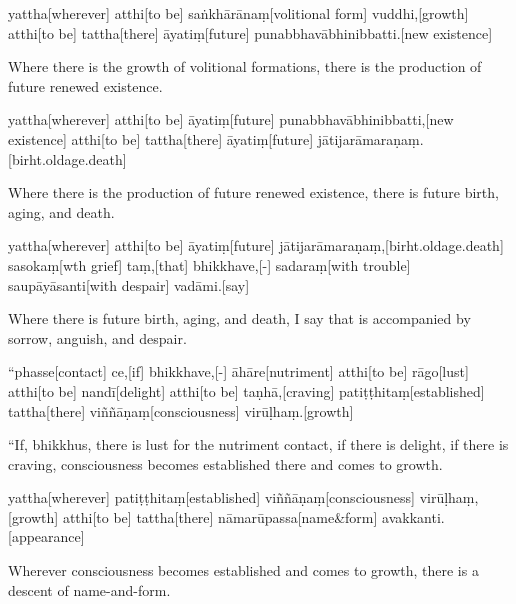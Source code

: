 \begin{samepage}
\begingl[glneveryline={\PaliGlossA,\PaliGlossB}]
yattha[wherever] atthi[to be] saṅkhārānaṃ[volitional form] vuddhi,[growth] atthi[to be] tattha[there] āyatiṃ[future] punabbhavābhinibbatti.[new existence]
\endgl
\nopagebreak
\linespread{0.5}
\begin{spacin}{0.2}
{\PaliGlossFT Where there is the growth of volitional formations, there is the production of future renewed existence.}
\end{spacin}
\vskip 12pt
\end{samepage}
\begin{samepage}
\begingl[glneveryline={\PaliGlossA,\PaliGlossB}]
yattha[wherever] atthi[to be] āyatiṃ[future] punabbhavābhinibbatti,[new existence] atthi[to be] tattha[there] āyatiṃ[future] jātijarāmaraṇaṃ.[birht.oldage.death]
\endgl
\nopagebreak
\linespread{0.5}
\begin{spacin}{0.2}
{\PaliGlossFT Where there is the production of future renewed existence, there is future birth, aging, and death.}
\end{spacin}
\vskip 12pt
\end{samepage}
\begin{samepage}
\begingl[glneveryline={\PaliGlossA,\PaliGlossB}]
yattha[wherever] atthi[to be] āyatiṃ[future] jātijarāmaraṇaṃ,[birht.oldage.death] sasokaṃ[wth grief] taṃ,[that] bhikkhave,[-] sadaraṃ[with trouble] saupāyāsanti[with despair] vadāmi.[say]
\endgl
\nopagebreak
\linespread{0.5}
\begin{spacin}{0.2}
{\PaliGlossFT Where there is future birth, aging, and death, I say that is accompanied by sorrow, anguish, and despair.}
\end{spacin}
\vskip 12pt
\end{samepage}
\vskip 0.2in
\begin{samepage}
\begingl[glneveryline={\PaliGlossA,\PaliGlossB}]
“phasse[contact] ce,[if] bhikkhave,[-] āhāre[nutriment] atthi[to be] rāgo[lust] atthi[to be] nandī[delight] atthi[to be] taṇhā,[craving] patiṭṭhitaṃ[established] tattha[there] viññāṇaṃ[consciousness] virūḷhaṃ.[growth]
\endgl
\nopagebreak
\linespread{0.5}
\begin{spacin}{0.2}
{\PaliGlossFT “If, bhikkhus, there is lust for the nutriment contact, if there is delight, if there is craving, consciousness becomes established there and comes to growth.}
\end{spacin}
\vskip 12pt
\end{samepage}
\begin{samepage}
\begingl[glneveryline={\PaliGlossA,\PaliGlossB}]
yattha[wherever] patiṭṭhitaṃ[established] viññāṇaṃ[consciousness] virūḷhaṃ,[growth] atthi[to be] tattha[there] nāmarūpassa[name\&form] avakkanti.[appearance]
\endgl
\nopagebreak
\linespread{0.5}
\begin{spacin}{0.2}
{\PaliGlossFT Wherever consciousness becomes established and comes to growth, there is a descent of name-and-form.}
\end{spacin}
\vskip 12pt
\end{samepage}
